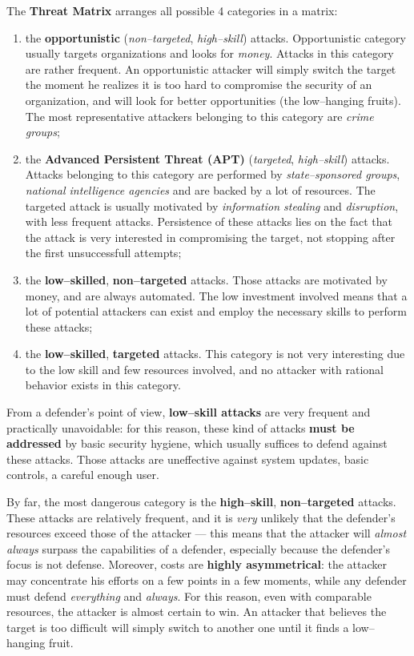 \documentclass[10pt]{\classname}
\begin{document}
The \textbf{Threat Matrix} arranges all possible 4 categories in a matrix:
\begin{enumerate}
    \item the \textbf{opportunistic} (\emph{non--targeted}, \emph{high--skill})
        attacks. Opportunistic category usually targets organizations and looks
        for \emph{money}. Attacks in this category are rather frequent. An
        opportunistic attacker will simply switch the target the moment he
        realizes it is too hard to compromise the security of an organization,
        and will look for better opportunities (the low--hanging fruits). The
        most representative attackers belonging to this category are
        \emph{crime groups};
    \item the \textbf{Advanced Persistent Threat (APT)} (\emph{targeted},
        \emph{high--skill}) attacks. Attacks belonging to this category are
        performed by \emph{state--sponsored groups}, \emph{national
        intelligence agencies} and are backed by a lot of resources. The
        targeted attack is usually motivated by \emph{information stealing} and
        \emph{disruption}, with less frequent attacks. Persistence of these
        attacks lies on the fact that the attack is very interested in
        compromising the target, not stopping after the first unsuccessfull
        attempts;
    \item the \textbf{low--skilled}, \textbf{non--targeted} attacks. Those
        attacks are motivated by money, and are always automated. The low
        investment involved means that a lot of potential attackers can exist
        and employ the necessary skills to perform these attacks;
    \item the \textbf{low--skilled}, \textbf{targeted} attacks. This category
        is not very interesting due to the low skill and few resources
        involved, and no attacker with rational behavior exists in this
        category.
\end{enumerate}

From a defender's point of view, \textbf{low--skill attacks} are very frequent
and practically unavoidable: for this reason, these kind of attacks
\textbf{must be addressed} by basic security hygiene, which usually suffices to
defend against these attacks. Those attacks are uneffective against system
updates, basic controls, a careful enough user.

By far, the most dangerous category is the \textbf{high--skill},
\textbf{non--targeted} attacks. These attacks are relatively frequent, and it
is \emph{very} unlikely that the defender's resources exceed those of the
attacker --- this means that the attacker will \emph{almost always} surpass the
capabilities of a defender, especially because the defender's focus is not
defense. Moreover, costs are \textbf{highly asymmetrical}: the attacker
may concentrate his efforts on a few points in a few moments, while any
defender must defend \emph{everything} and \emph{always}. For this reason, even
with comparable resources, the attacker is almost certain to win. An attacker
that believes the target is too difficult will simply switch to another one
until it finds a low--hanging fruit.
\end{document}
